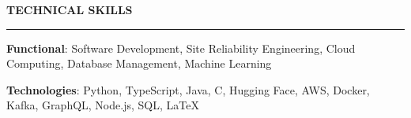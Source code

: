 \documentclass{cv}
\begin{document}

\sectionskip


\textbf{\uppercase{Technical Skills}}
\sectionlineskip
\hrule height 0.6pt
\begin{list}{}{\setlength{\leftmargin}{0pt}}
\itemsep -3.0pt
\item
    \textbf{Functional}: Software Development, Site Reliability Engineering, Cloud Computing, Database Management, Machine Learning
\item
    \textbf{Technologies}: Python, TypeScript, Java, C, Hugging Face, AWS, Docker, Kafka, GraphQL, Node.js, SQL, \LaTeX
\end{list}


\sectionskip

\end{document}
